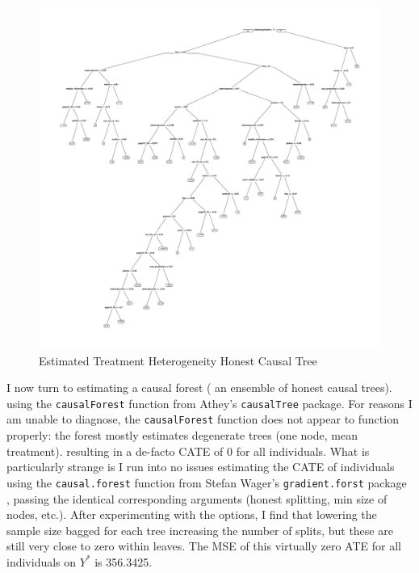 \documentclass{article}
\begin{document}
\begin{figure}[!ht]
\center
\caption{Estimated Treatment Heterogeneity Honest Causal Tree }
\label{honesttree}
\includegraphics[scale=1]{honestCT.pdf}
\end{figure}
 

 I now turn to estimating a causal forest ( an ensemble of honest causal trees). using the \texttt{causalForest} function from Athey's \texttt{causalTree} package. For reasons I am unable to diagnose, the \texttt{causalForest} function does not appear to function properly: the forest mostly estimates degenerate trees (one node, mean treatment). resulting in a de-facto CATE of $0$ for all individuals. What is particularly strange is I run into no issues estimating the CATE of individuals using the \texttt{causal.forest} function from Stefan Wager's \texttt{gradient.forst} package , passing the identical corresponding arguments (honest splitting, min size of nodes, etc.). After experimenting with the options, I find that lowering the sample size bagged for each tree increasing the number of splits, but these are still very close to zero within leaves. The MSE of this virtually zero ATE for all individuals on $Y^*$ is 356.3425.
\end{document}
